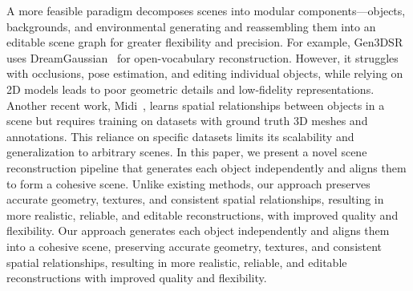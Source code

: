 A more feasible paradigm decomposes scenes into modular components—objects, backgrounds, and environmental generating and reassembling them into an editable scene graph for greater flexibility and precision. For example, Gen3DSR~\cite{dogaru2024generalizable} uses DreamGaussian~\cite{tang2023dreamgaussian} for open-vocabulary reconstruction. However, it struggles with occlusions, pose estimation, and editing individual objects, while relying on 2D models leads to poor geometric details and low-fidelity representations.
Another recent work, Midi~\cite{huang2024midi}, learns spatial relationships between objects in a scene but requires training on datasets with ground truth 3D meshes and annotations. This reliance on specific datasets limits its scalability and generalization to arbitrary scenes.
In this paper, we present a novel scene reconstruction pipeline that generates each object independently and aligns them to form a cohesive scene. Unlike existing methods, our approach preserves accurate geometry, textures, and consistent spatial relationships, resulting in more realistic, reliable, and editable reconstructions, with improved quality and flexibility.
Our approach generates each object independently and aligns them into a cohesive scene, preserving accurate geometry, textures, and consistent spatial relationships, resulting in more realistic, reliable, and editable reconstructions with improved quality and flexibility.


